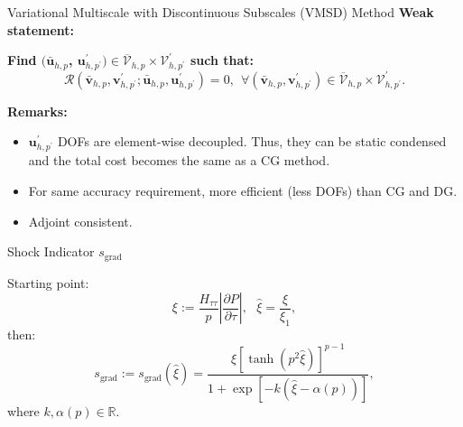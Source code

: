 \documentclass{beamer}
\newcounter{sectionframecount}
\begin{document}
\begin{frame}[t]{Variational Multiscale with Discontinuous Subscales (VMSD) Method}
  \textbf{Weak statement:}

  \vspace{10pt}
  \textbf{Find $(\bar{\boldsymbol{u}}_{h,p}$, $\boldsymbol{u}^\prime_{h,p^\prime}) \in \overline{\mathcal{V}}_{h,p} \times \mathcal{V}^\prime_{h,p^\prime}$ such that:}
  \begin{equation}
    \mathcal{R}(\bar{\boldsymbol{v}}_{h,p},\boldsymbol{v}^\prime_{h,p^\prime};\bar{\boldsymbol{u}}_{h,p},\boldsymbol{u}^\prime_{h,p^\prime}) = 0,~~\forall (\bar{\boldsymbol{v}}_{h,p},\boldsymbol{v}^\prime_{h,p^\prime}) \in \overline{\mathcal{V}}_{h,p} \times \mathcal{V}^\prime_{h,p^\prime}.
    \label{e:multiscale_weak_statement}
  \end{equation}

  \vspace{10pt}
  \textbf{Remarks:}
  \begin{itemize}
    \item $\boldsymbol{u}^\prime_{h,p^\prime}$ DOFs are element-wise decoupled. Thus, they can be static condensed and the total cost becomes the same as a CG method.
    \item For same accuracy requirement, more efficient (less DOFs) than CG and DG.
    \item Adjoint consistent.
  \end{itemize}
\end{frame}


\begin{frame}[t]{Shock Indicator $s_{\text{grad}}$}

  Starting point:
  \begin{equation}
    \xi := \dfrac{H_{\tau\tau}}{p} \left|\dfrac{\partial P}{\partial \tau}\right|,~~~\hat{\xi} = \dfrac{\xi}{\xi_1},
  \end{equation}
  then:
  \begin{equation}
    s_\text{grad} := s_\text{grad}(\hat{\xi}) = \dfrac{\hat{\xi} [\tanh(p^2\hat{\xi})]^{p-1}}{1+\exp\left[-k \left(\hat{\xi} - \alpha(p)\right)\right]},
    \label{e:s_grad}
  \end{equation}
  where $k,\alpha(p) \in \mathbb{R}$.
\end{frame}

\end{document}
